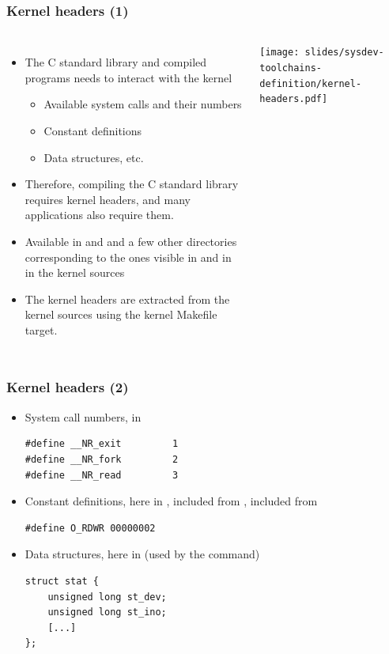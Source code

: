 \begin{frame}
  \frametitle{Kernel headers (1)}
  \begin{columns}
    \begin{itemize}
    \item The C standard library and compiled programs needs to interact with the kernel
      \begin{itemize}
      \item Available system calls and their numbers
      \item Constant definitions
      \item Data structures, etc.
      \end{itemize}
    \item Therefore, compiling the C standard library requires kernel headers, and many
      applications also require them.
    \item Available in  and  and a few
      other directories corresponding to the ones visible in
       and in  in the kernel sources
    \item The kernel headers are extracted from the kernel sources using
      the  kernel Makefile target.
    \end{itemize}
    \texttt{[image: slides/sysdev-toolchains-definition/kernel-headers.pdf]}
  \end{columns}
\end{frame}

\begin{frame}[fragile]
  \frametitle{Kernel headers (2)}
  \begin{itemize}
  \item System call numbers, in 
\begin{verbatim}
#define __NR_exit         1
#define __NR_fork         2
#define __NR_read         3
\end{verbatim}
  \item Constant definitions, here in ,
    included from , included from
\begin{verbatim}
#define O_RDWR 00000002
\end{verbatim}
\item Data structures, here in  (used by the
 command)
\begin{verbatim}
struct stat {
    unsigned long st_dev;
    unsigned long st_ino;
    [...]
};
\end{verbatim}
\end{itemize}
\end{frame}

